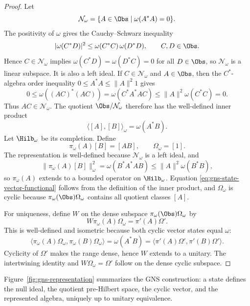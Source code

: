 \begin{proof}
Let
\[
  \mathcal N_\omega=\{A\in\Obs\mid \omega(A^*A)=0\}.
\]
The positivity of \(\omega\) gives the Cauchy--Schwarz inequality
\[
  |\omega(C^*D)|^2\le \omega(C^*C)\,\omega(D^*D),
  \qquad C,D\in\Obs.
\]
Hence \(C\in\mathcal N_\omega\) implies
\(\omega(C^*D)=\omega(D^*C)=0\) for all \(D\in\Obs\), so
\(\mathcal N_\omega\) is a linear subspace.  It is also a left ideal.  If
\(C\in\mathcal N_\omega\) and \(A\in\Obs\), then the \(C^*\)-algebra order
inequality \(0\le A^*A\le \|A\|^2 1\) gives
\[
  0\le \omega((AC)^*(AC))
  =
  \omega(C^*A^*AC)
  \le
  \|A\|^2\omega(C^*C)
  =
  0 .
\]
Thus \(AC\in\mathcal N_\omega\).  The quotient
\(\Obs/\mathcal N_\omega\) therefore has the well-defined inner product
\[
  \langle [A],[B]\rangle_\omega=\omega(A^*B).
\]
Let \(\Hilb_\omega\) be its completion.  Define
\[
  \pi_\omega(A)[B]=[AB],
  \qquad
  \Omega_\omega=[1].
\]
The representation is well-defined because \(\mathcal N_\omega\) is a left
ideal, and
\[
  \|\pi_\omega(A)[B]\|_\omega^2
  =
  \omega(B^*A^*AB)
  \le
  \|A\|^2\omega(B^*B),
\]
so \(\pi_\omega(A)\) extends to a bounded operator on \(\Hilb_\omega\).
Equation \eqref{eq:gns-state-vector-functional} follows from the definition
of the inner product, and \(\Omega_\omega\) is cyclic because
\(\pi_\omega(\Obs)\Omega_\omega\) contains all quotient classes \([A]\).

For uniqueness, define \(W\) on the dense subspace
\(\pi_\omega(\Obs)\Omega_\omega\) by
\[
  W\pi_\omega(A)\Omega_\omega=\pi'(A)\Omega'.
\]
This is well-defined and isometric because both cyclic vector states equal
\(\omega\):
\[
  \langle\pi_\omega(A)\Omega_\omega,\pi_\omega(B)\Omega_\omega\rangle
  =
  \omega(A^*B)
  =
  \langle\pi'(A)\Omega',\pi'(B)\Omega'\rangle .
\]
Cyclicity of \(\Omega'\) makes the range dense, hence \(W\) extends to a
unitary.  The intertwining identity and \(W\Omega_\omega=\Omega'\) follow on
the dense cyclic subspace.
\end{proof}

Figure~\ref{fig:gns-representation} summarizes the GNS construction: a state
defines the null ideal, the quotient pre-Hilbert space, the cyclic vector, and
the represented algebra, uniquely up to unitary equivalence.

